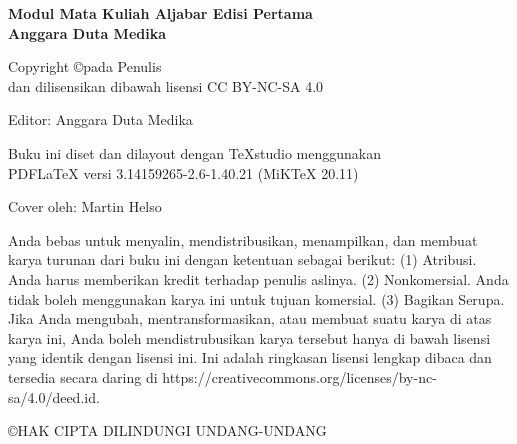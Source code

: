 {
	\centering
	
	\textbf{Modul Mata Kuliah Aljabar Edisi Pertama} \\
	\textbf{Anggara Duta Medika}
	
	\vspace{0.5cm}
	
	Copyright \copyright \space \the\year \space pada Penulis \\
	dan dilisensikan dibawah lisensi CC BY-NC-SA 4.0
	
	\vspace{0.5cm}
	
	Editor: Anggara Duta Medika
	
	\vspace{0.5cm}
	
	Buku ini diset dan dilayout dengan TeXstudio menggunakan \\
	PDFLaTeX versi 3.14159265-2.6-1.40.21 (MiKTeX 20.11)
	
	\vspace{0.5cm}
	
	Cover oleh: Martin Helso
	
	\vspace{0.5cm}
	
	\begin{center}
		Anda bebas untuk menyalin, mendistribusikan, menampilkan, dan membuat karya turunan dari buku ini dengan ketentuan sebagai berikut: (1) Atribusi. Anda harus memberikan kredit terhadap penulis aslinya. (2) Nonkomersial. Anda tidak boleh menggunakan karya ini untuk tujuan komersial. (3) Bagikan Serupa. Jika Anda mengubah, mentransformasikan, atau membuat suatu karya di atas karya ini, Anda boleh mendistrubusikan karya tersebut hanya di bawah lisensi yang identik dengan lisensi ini. Ini adalah ringkasan lisensi lengkap dibaca dan tersedia secara daring di https://creativecommons.org/licenses/by-nc-sa/4.0/deed.id.
	\end{center}
	
	\vspace{0.5cm}
	
	\begin{center}
		\copyright \space HAK CIPTA DILINDUNGI UNDANG-UNDANG
	\end{center}
}

\vspace*{\fill}